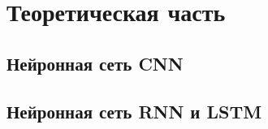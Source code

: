 \documentclass[bachelor, och, coursework]{SCWorks}
\begin{document}








\section{Теоретическая часть}

    \subsection{Нейронная сеть CNN}
    \subsection{Нейронная сеть RNN и LSTM}
\end{document}
